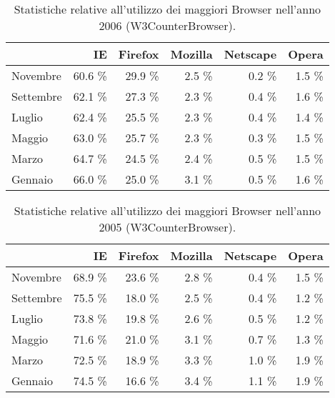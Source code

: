 \begin{table}
\begin{center}
\begin{tabular}{||p{4cm}|*{5}{r|}|}
	\hline
	\centering {\bfseries 2006}  & IE & Firefox & Mozilla & Netscape & Opera \\
	\hline
	\hline
	Novembre & 60.6 \% & 29.9 \% & 2.5 \% & 0.2 \% & 1.5 \% \\
	\hline
	Settembre & 62.1 \% & 27.3 \% & 2.3 \% & 0.4 \% & 1.6 \% \\
	\hline
	Luglio & 62.4 \% & 25.5 \% & 2.3 \% & 0.4 \% & 1.4 \% \\
	\hline
	Maggio & 63.0 \% & 25.7 \% & 2.3 \% & 0.3 \% & 1.5 \% \\
	\hline
	Marzo & 64.7 \% & 24.5 \% & 2.4 \% & 0.5 \% & 1.5 \% \\
	\hline
	Gennaio & 66.0 \% & 25.0 \% & 3.1 \% & 0.5 \% & 1.6 \% \\
	\hline
\end{tabular}
 \caption{Statistiche relative all'utilizzo dei maggiori Browser nell'anno 2006 (W3CounterBrowser).}
 \label{tab:lp}
\end{center}
\end{table}

\begin{table}
\begin{center}
\begin{tabular}{||p{4cm}|*{5}{r|}|}
	\hline
	\centering {\bfseries 2005}  & IE & Firefox & Mozilla & Netscape & Opera \\
	\hline
	\hline
	Novembre & 68.9 \% & 23.6 \% & 2.8 \% & 0.4 \% & 1.5 \% \\
	\hline
	Settembre & 75.5 \% & 18.0 \% & 2.5 \% & 0.4 \% & 1.2 \% \\
	\hline
	Luglio & 73.8 \% & 19.8 \% & 2.6 \% & 0.5 \% & 1.2 \% \\
	\hline
	Maggio & 71.6 \% & 21.0 \% & 3.1 \% & 0.7 \% & 1.3 \% \\
	\hline
	Marzo & 72.5 \% & 18.9 \% & 3.3 \% & 1.0 \% & 1.9 \% \\
	\hline
	Gennaio & 74.5 \% & 16.6 \% & 3.4 \% & 1.1 \% & 1.9 \% \\
	\hline
\end{tabular}
 \caption{Statistiche relative all'utilizzo dei maggiori Browser nell'anno 2005 (W3CounterBrowser).}
 \label{tab:brow_stats_2005}
\end{center}
\end{table}

